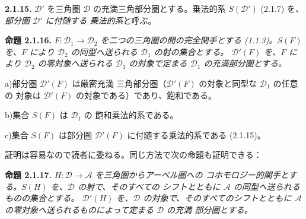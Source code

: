\clearpage
{}%
\begingroup
\small
\setlength{\emergencystretch}{1.5em}%
\setlength{\abovedisplayskip}{1pt plus 1pt minus 1pt}%
\setlength{\belowdisplayskip}{1pt plus 1pt minus 1pt}%

\noindent\textbf{2.1.15.}\quad
{}%
$\mathcal D'$ を三角圏 $\mathcal D$ の充満三角部分圏とする。乗法的系
$S(\mathcal D')$ (2.1.7) を、\emph{部分圏 $\mathcal D'$ に付随する
乗法的系}と呼ぶ。

\smallskip
\noindent\textbf{命題 2.1.16.}\quad
\begingroup\itshape
{}%
$F\colon\mathcal D_1\to\mathcal D_2$ を二つの三角圏の間の完全関手とする
(1.1.3)。$S(F)$ を、$F$ により $\mathcal D_2$ の同型へ送られる
$\mathcal D_1$ の射の集合とする。
%
$\mathcal D'(F)$ を、$F$ により $\mathcal D_2$ の零対象へ送られる
$\mathcal D_1$ の対象で定まる $\mathcal D_1$ の充満部分圏とする。

\par\noindent\hspace*{2em}a)\enspace 部分圏 $\mathcal D'(F)$ は厳密充満
三角部分圏（$\mathcal D'(F)$ の対象と同型な $\mathcal D_1$ の任意の
対象は $\mathcal D'(F)$ の対象である）であり、飽和である。

\par\noindent\hspace*{2em}b)\enspace 集合 $S(F)$ は $\mathcal D_1$ の
飽和乗法的系である。

\par\noindent\hspace*{2em}c)\enspace 集合 $S(F)$ は部分圏
$\mathcal D'(F)$ に付随する乗法的系である (2.1.15)。
\par\endgroup

\noindent 証明は容易なので読者に委ねる。同じ方法で次の命題も証明できる：

\smallskip
\noindent\textbf{命題 2.1.17.}\quad
\begingroup\itshape
{}%
$H\colon\mathcal D\to\mathcal A$ を三角圏からアーベル圏への
コホモロジー的関手とする。$S(H)$ を、$\mathcal D$ の射で、そのすべての
シフトとともに $\mathcal A$ の同型へ送られるものの集合とする。
%
$\mathcal D'(H)$ を、$\mathcal D$ の対象で、そのすべてのシフトとともに
$\mathcal A$ の零対象へ送られるものによって定まる $\mathcal D$ の充満
部分圏とする。

